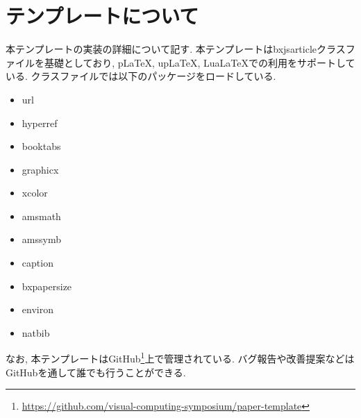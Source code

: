 \documentclass{vc}
\begin{document}
\section{テンプレートについて}

本テンプレートの実装の詳細について記す.
本テンプレートは\textsf{bxjsarticle}クラスファイルを基礎としており, pLaTeX, upLaTeX, LuaLaTeXでの利用をサポートしている.
クラスファイルでは以下のパッケージをロードしている.
\begin{itemize}
  \item \textsf{url}
  \item \textsf{hyperref}
  \item \textsf{booktabs}
  \item \textsf{graphicx}
  \item \textsf{xcolor}
  \item \textsf{amsmath}
  \item \textsf{amssymb}
  \item \textsf{caption}
  \item \textsf{bxpapersize}
  \item \textsf{environ}
  \item \textsf{natbib}
\end{itemize}

なお, 本テンプレートはGitHub\footnote{\url{https://github.com/visual-computing-symposium/paper-template}}上で管理されている.
バグ報告や改善提案などはGitHubを通して誰でも行うことができる.



\end{document}
